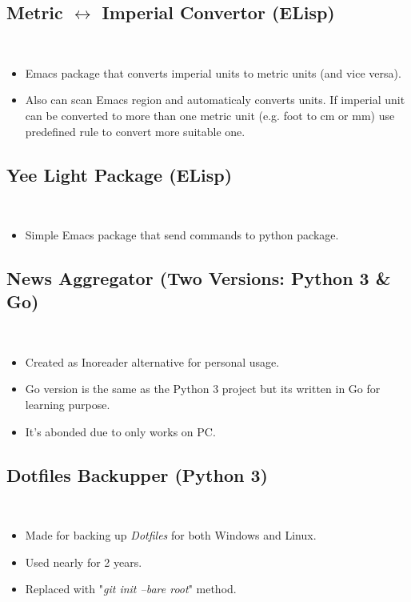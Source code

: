 {	\subsection{Metric $\longleftrightarrow$ Imperial Convertor (ELisp)} \hfill \\
	\begin{itemize}
		\item Emacs package that converts imperial units to metric units
		(and vice versa).
		\item Also can scan Emacs region and automaticaly converts units. If imperial
		unit can be converted to more than one metric unit (e.g. foot to cm or mm)
		use predefined rule to convert more suitable one.
	\end{itemize}


	\subsection{Yee Light Package (ELisp)} \hfill \\
	\begin{itemize}
		\item Simple Emacs package that send commands to  python
		package.
	\end{itemize}

	\subsection{News Aggregator (Two Versions: Python 3 \& Go)} \hfill \\
	\begin{itemize}
		\item Created as Inoreader alternative for personal usage.
		\item Go version is the same as the Python 3 project but its written in Go
		for learning purpose.
		\item It's abonded due to only works on PC.
	\end{itemize}


	\subsection{Dotfiles Backupper (Python 3)} \hfill \\
	\begin{itemize}
		\item Made for backing up \emph{Dotfiles} for both Windows and Linux.
		\item Used nearly for 2 years.
		\item Replaced with "\emph{git init --bare root}" method.
	\end{itemize}
}

